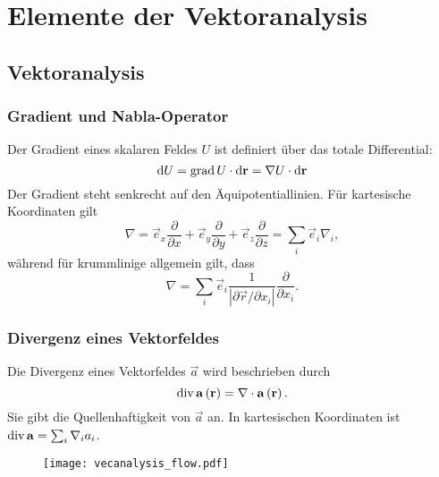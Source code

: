 

\chapter{Elemente der Vektoranalysis\label{elemente_der_vektoranalysis}}

\section{Vektoranalysis}

\subsection{Gradient und Nabla-Operator}

Der Gradient eines skalaren Feldes $U$ ist definiert über das totale Differential:
\begin{equation*}
	\mathop{}\!\mathrm{d} U=\operatorname{grad} U\cdot \mathop{}\!\mathrm{d} \mathbf{r}=\nabla U\cdot \mathop{}\!\mathrm{d} \mathbf{r}
\end{equation*}
Der Gradient steht senkrecht auf den Äquipotentiallinien. Für kartesische Koordinaten gilt
\begin{equation*}
	\nabla =\vec {e}_{x}\frac{\partial }{\partial x}+\vec {e}_{y}\frac{\partial }{\partial y}+\vec {e}_{z}\frac{\partial }{\partial z}=\sum _{i}\vec {e}_{i}\nabla _{i},
\end{equation*}
während für krummlinige allgemein gilt, dass
\begin{equation*}
	\nabla =\sum _{i}\vec {e}_{i}\frac{1}{\left| \partial \vec {r}/\partial x_{i}\right| }\frac{\partial }{\partial x_{i}}.
\end{equation*}
\subsection{Divergenz eines Vektorfeldes\label{ref-007}}

Die Divergenz eines Vektorfeldes $\vec {a}$ wird beschrieben durch
\begin{equation*}
	\operatorname{div} \mathbf{a}\left(\mathbf{r}\right)=\nabla \cdot \mathbf{a}\left(\mathbf{r}\right).
\end{equation*}
Sie gibt die Quellenhaftigkeit von $\vec {a}$ an. In kartesischen Koordinaten ist $\operatorname{div} \mathbf{a}=\sum _{i}\nabla _{i}a_{i}$.



\begin{figure}[htb]
	\centering
	\texttt{[image: vecanalysis\_flow.pdf]}
	\caption{}
	\label{fig:vecanalysis_flow}
\end{figure}

